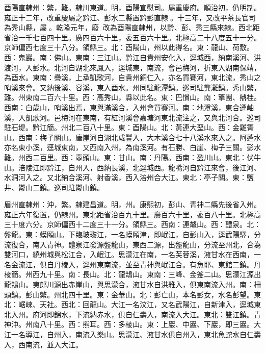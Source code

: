 \begin{pinyinscope}
酉陽直隸州：繁，難。隸川東道。明，酉陽宣慰司。屬重慶府。順治初，仍明制。雍正十二年，改重慶屬之黔江、彭水二縣置黔彭直隸。十三年，又改平茶長官司為秀山縣，屬。乾隆元年，廢，改為酉陽直隸州，以黔、彭、秀三縣來隸。西北距省治一千七百四十里。廣四百六十里，袤五百六十里。北極高二十八度五十一分。京師偏西七度三十八分。領縣三。北：酉陽山，州以此得名。東：龍山、荷敷。西：鬼巖。南：佛山。東南：三江山。黔江自貴州安化入，逕城西，納南溪河、洪渡河，入彭水。北河自湖北來鳳入，逕城東，南流，會邑梅河，折東入湖南保靖，為酉水。東南：疊溪，上承凱歌河，自貴州銅仁入，亦名買賽河，東北流，秀山之哨溪來會。又納後溪、容溪，東入酉水。州同駐龍潭鎮。巡司駐龔灘鎮。秀山繁，難。州東南二百六十里。西：高秀山，縣以此名。東：巴慣山。南：擎團、鼎桂。西南：白歲山，哨溪出焉，東與滿溪合，入州會買賽河。南：地澄溪，東合遵岫溪，入凱歌河。邑梅河在東南，有紅河溪會嘉塘河東北流注之，又與北河合。巡司駐石堤。黔江簡。州北二百八十里。東：酉陽山。北：黃連大堊山。西：金雞箐山。西南：梅子關山。唐崖河自湖北咸豐入，大木溪合七十八溪水來入之。阿蓬水亦名東小溪，逕城東南，又西南入州，為南溪河。有石勝、白崖、梅子三關。彭水難。州西二百里。西：壺頭山。東：甘山。南：丹陽。西南：盈川山。東北：伏牛山。涪陵江即黔江，自州入，西納長溪，北逕城西。龍嘴河自黔江來會，後江河、水洞河入之。又北納合溪河、射香溪，西入涪州合大江。東北：亭子關。東：鹽井、鬱山二鎮。巡司駐鬱山鎮。

眉州直隸州：沖，繁。隸建昌道。明，州。康熙初，彭山、青神二縣先後省入州。雍正六年復置，仍隸州。東北距省治百九十里。廣百六十里，袤百八十里。北極高三十度六分。京師偏西十二度三十一分。領縣三。西南：連鼇山。西：醴泉。北：盤龍。東：蟆頤山。下臨玻瓈江，一名蟆頤津，即岷江，自彭山入，逕武陽驛，分流復合，南入青神。醴泉江發源盤龍山，東西二源，出盤龍山，分流至州北，合為雙河口，繞州城與松江合，入岷江。思濛江在南，一名芙蓉溪，澭甘水在西南，一名金流江，俱自丹棱入，逕州東南流，並至青神與岷江合。有魚耶、東館二鎮。丹棱簡。州西九十里。南：長山。北：龍鵠山。東南：三峰、金釜二山。思濛江源出龍鵠山。夷郎川源出赤崖山，與思濛合，澭甘水自洪雅入，俱東南流入州。南：柵頭鎮。彭山繁。州北四十里。東：金華山。北：彭亡山，本名彭女，水名彭望。東北：崌崍、天社。西北：回龍山。大江一名汶江，又名武陽江，自新津入，逕城東北入州。府河即錦水，下流納赤水，俱自仁壽入，南流入大江。東北：雙江鎮。青神沖。州南八十里。西：熊耳。西：多棱山。東：上巖、中巖、下巖，即三巖。大江一名導江，自州入，南流入樂山。思濛江、澭甘水俱自州入，東北魚蛇水自仁壽入，西南流，並入大江。


\end{pinyinscope}

